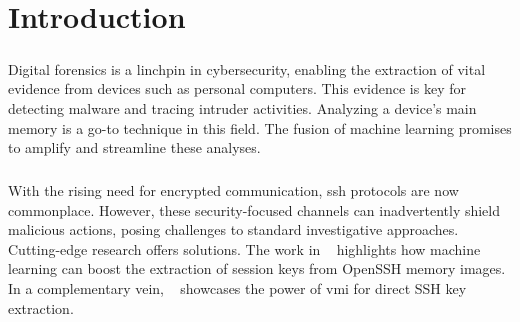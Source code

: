 \chapter{Introduction}\label{chap:introduction}


\begin{comment}
Motivate your research and outline the research gap in this chapter. Why is your thesis relevant and what do you address, what has not been addressed before. 

General Requirements to the thesis:

\begin{itemize}
	\item 60 pages of content in this format. Content does not include table of content, lists, appendices etc.
	\item Proper scientific referencing
	\item Introduction and Background should be less than 50\% of the thesis
	\item Images should be readable and in the proper size. 
\end{itemize}
\end{comment}


\paragraph*{}Digital forensics is a linchpin in cybersecurity, enabling the extraction of vital evidence from devices such as personal computers. This evidence is key for detecting malware and tracing intruder activities. Analyzing a device's main memory is a go-to technique in this field. The fusion of machine learning promises to amplify and streamline these analyses.
 
\paragraph*{}With the rising need for encrypted communication, \acrfull{ssh} protocols are now commonplace. However, these security-focused channels can inadvertently shield malicious actions, posing challenges to standard investigative approaches. Cutting-edge research offers solutions. The work in ~\cite*{fellicious_smartkex_2022} highlights how machine learning can boost the extraction of session keys from OpenSSH memory images. In a complementary vein, ~\cite*{sentanoe_sshkex_2022} showcases the power of \acrfull{vmi} for direct SSH key extraction.

